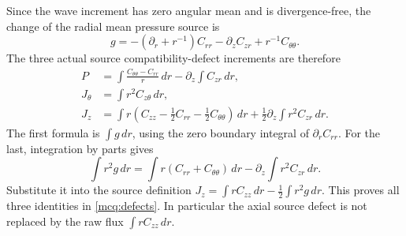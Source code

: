 \documentclass[11pt]{article}
\begin{document}
Since the wave increment has zero angular mean and is divergence-free,
the change of the radial mean pressure source is
\[
 g=-(\partial_r+r^{-1})C_{rr}-\partial_zC_{zr}+r^{-1}C_{\theta\theta}.
\]
The three actual source compatibility-defect increments are therefore
\begin{equation}\label{mcq:defects}
\begin{split}
 P&=\int\frac{C_{\theta\theta}-C_{rr}}r\,dr
                    -\partial_z\int C_{zr}\,dr,\\
 J_\theta&=\int r^2C_{z\theta}\,dr,\\
 J_z&=\int r\left(C_{zz}-\tfrac12C_{rr}
                              -\tfrac12C_{\theta\theta}\right)\,dr
                  +\tfrac12\partial_z\int r^2C_{zr}\,dr .
\end{split}
\end{equation}
The first formula is \(\int g\,dr\), using the zero boundary integral
of \(\partial_r C_{rr}\). For the last, integration by parts gives
\[
 \int r^2 g\,dr
  =\int r(C_{rr}+C_{\theta\theta})\,dr
                      -\partial_z\int r^2C_{zr}\,dr .
\]
Substitute it into the source definition
\(J_z=\int rC_{zz}\,dr-\frac12\int r^2g\,dr\).
This proves all three identities in \eqref{mcq:defects}.
In particular the axial source defect is not replaced by the raw flux
\(\int rC_{zz}\,dr\).
\end{document}
